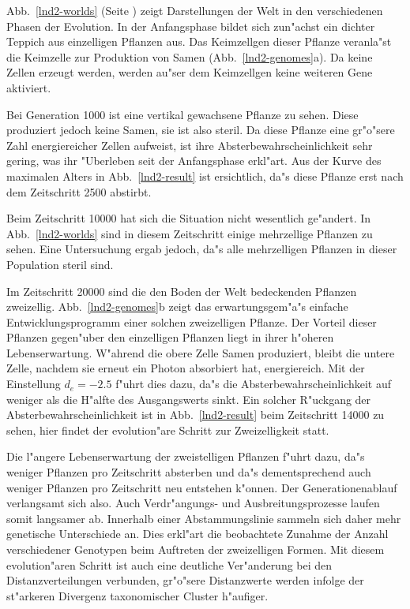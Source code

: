 Abb.\ \ref{lnd2-worlds} (Seite \pageref{lnd2-worlds}) zeigt Darstellungen der Welt in den verschiedenen Phasen
der Evolution. In der Anfangsphase
bildet sich zun"achst ein dichter Teppich aus einzelligen Pflanzen aus. Das Keimzellgen dieser Pflanze veranla"st
die Keimzelle zur Produktion von Samen (Abb.\ \ref{lnd2-genomes}a). Da keine Zellen erzeugt werden, werden au"ser dem
Keimzellgen keine weiteren Gene aktiviert.

Bei Generation 1000 ist eine vertikal
gewachsene Pflanze zu sehen. Diese produziert jedoch keine Samen, sie ist also steril. Da diese Pflanze eine gr"o"sere
Zahl energiereicher Zellen aufweist, ist ihre Absterbewahrscheinlichkeit sehr gering, was ihr "Uberleben seit der
Anfangsphase erkl"art. Aus der Kurve des maximalen Alters in Abb.\ \ref{lnd2-result} ist ersichtlich, da"s diese
Pflanze erst nach dem Zeitschritt 2500 abstirbt.

Beim Zeitschritt 10000 hat sich die Situation nicht wesentlich ge"andert. In Abb.\ \ref{lnd2-worlds} sind in diesem
Zeitschritt einige mehrzellige Pflanzen zu sehen. Eine Untersuchung ergab jedoch, da"s alle mehrzelligen Pflanzen
in dieser Population steril sind.

Im Zeitschritt 20000 sind die den Boden der Welt bedeckenden Pflanzen zweizellig. Abb.\ \ref{lnd2-genomes}b zeigt
das erwartungsgem"a"s einfache Entwicklungsprogramm einer solchen zweizelligen Pflanze. Der Vorteil dieser Pflanzen
gegen"uber den einzelligen Pflanzen liegt in ihrer h"oheren Lebenserwartung. W"ahrend die obere Zelle Samen produziert,
bleibt die untere Zelle, nachdem sie erneut ein Photon absorbiert hat, energiereich. Mit der Einstellung $d_e=-2.5$
f"uhrt dies dazu, da"s die Absterbewahrscheinlichkeit auf weniger als die H"alfte des Ausgangswerts sinkt. Ein solcher
R"uckgang der Absterbewahrscheinlichkeit ist in Abb.\ \ref{lnd2-result} beim Zeitschritt 14000 zu sehen, hier findet
der evolution"are Schritt zur Zweizelligkeit statt.

Die l"angere Lebenserwartung der zweistelligen Pflanzen f"uhrt dazu, da"s weniger Pflanzen pro Zeitschritt absterben
und da"s dementsprechend auch weniger Pflanzen pro Zeitschritt neu entstehen k"onnen. Der Generationenablauf verlangsamt
sich also. Auch Verdr"angungs- und Ausbreitungsprozesse laufen somit langsamer ab. Innerhalb einer Abstammungslinie
sammeln sich daher mehr genetische Unterschiede an. Dies erkl"art die beobachtete Zunahme der Anzahl verschiedener
Genotypen beim Auftreten der zweizelligen Formen. Mit diesem evolution"aren Schritt ist auch eine deutliche Ver"anderung
bei den Distanzverteilungen verbunden, gr"o"sere Distanzwerte werden infolge der st"arkeren Divergenz taxonomischer
Cluster h"aufiger.

